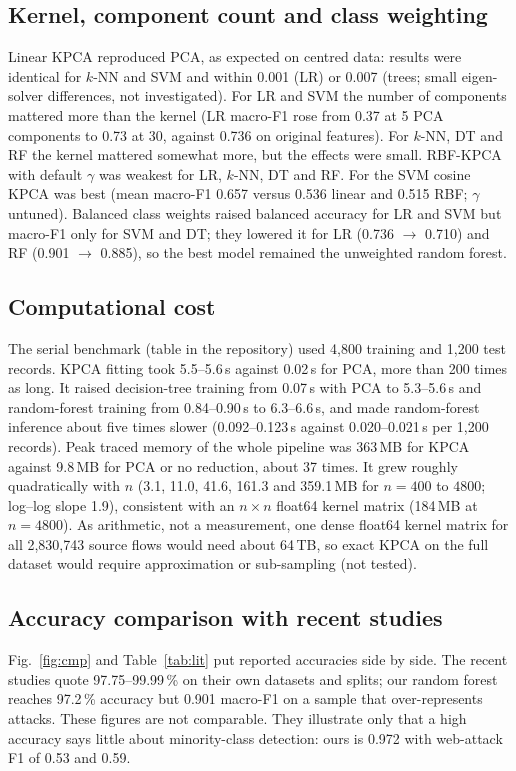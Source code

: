 \documentclass[runningheads]{llncs}
\begin{document}
\subsection{Kernel, component count and class weighting}
Linear KPCA reproduced PCA, as expected on centred data: results were identical for $k$-NN and SVM and within 0.001 (LR) or 0.007 (trees; small eigen-solver differences, not investigated). For LR and SVM the number of components mattered more than the kernel (LR macro-F1 rose from 0.37 at 5 PCA components to 0.73 at 30, against 0.736 on original features). For $k$-NN, DT and RF the kernel mattered somewhat more, but the effects were small. RBF-KPCA with default $\gamma$ was weakest for LR, $k$-NN, DT and RF. For the SVM cosine KPCA was best (mean macro-F1 0.657 versus 0.536 linear and 0.515 RBF; $\gamma$ untuned). Balanced class weights raised balanced accuracy for LR and SVM but macro-F1 only for SVM and DT; they lowered it for LR (0.736 $\to$ 0.710) and RF (0.901 $\to$ 0.885), so the best model remained the unweighted random forest.

\subsection{Computational cost}
The serial benchmark (table in the repository) used 4{,}800 training and 1{,}200 test records. KPCA fitting took 5.5--5.6\,s against 0.02\,s for PCA, more than 200 times as long. It raised decision-tree training from 0.07\,s with PCA to 5.3--5.6\,s and random-forest training from 0.84--0.90\,s to 6.3--6.6\,s, and made random-forest inference about five times slower (0.092--0.123\,s against 0.020--0.021\,s per 1{,}200 records). Peak traced memory of the whole pipeline was 363\,MB for KPCA against 9.8\,MB for PCA or no reduction, about 37 times. It grew roughly quadratically with $n$ (3.1, 11.0, 41.6, 161.3 and 359.1\,MB for $n=400$ to $4800$; log--log slope 1.9), consistent with an $n\times n$ float64 kernel matrix (184\,MB at $n=4800$). As arithmetic, not a measurement, one dense float64 kernel matrix for all 2{,}830{,}743 source flows would need about 64\,TB, so exact KPCA on the full dataset would require approximation or sub-sampling (not tested).







\subsection{Accuracy comparison with recent studies}
Fig.~\ref{fig:cmp} and Table~\ref{tab:lit} put reported accuracies side by side. The recent studies quote 97.75--99.99\,\% on their own datasets and splits; our random forest reaches 97.2\,\% accuracy but 0.901 macro-F1 on a sample that over-represents attacks. These figures are not comparable. They illustrate only that a high accuracy says little about minority-class detection: ours is 0.972 with web-attack F1 of 0.53 and 0.59.
\end{document}
